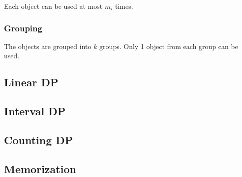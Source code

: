 \documentclass{article}
\begin{document}
Each object can be used at most $m_i$ times.

\subsubsection{Grouping}

The objects are grouped into $k$ groups. Only 1 object from each group can be used.



\subsection{Linear DP}
\subsection{Interval DP}
\subsection{Counting DP}
\subsection{Memorization}
\end{document}
